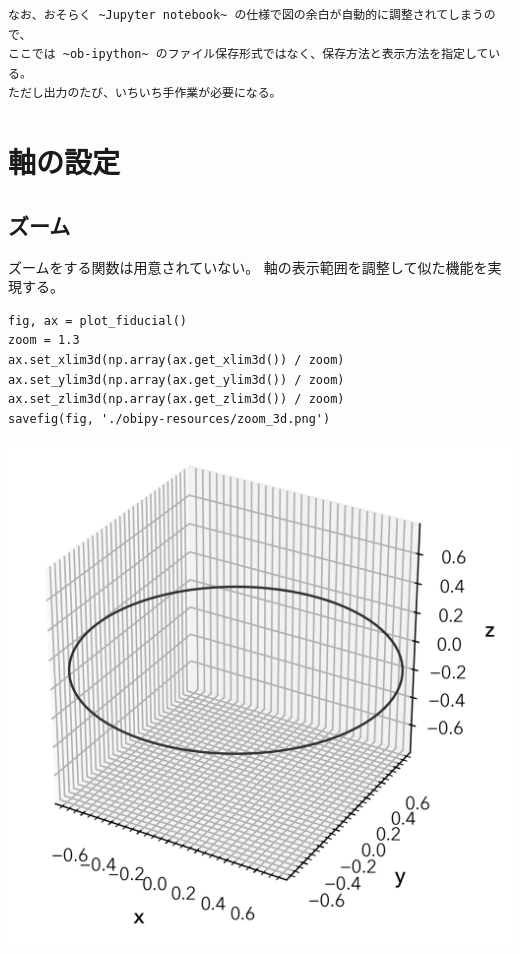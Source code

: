 \documentclass[a4paper, 10pt, notitlepage, twocolumn, uplatex, oneside, dvipdfmx]{jsarticle}
\begin{document}
\begin{verbatim}
なお、おそらく ~Jupyter notebook~ の仕様で図の余白が自動的に調整されてしまうので、
ここでは ~ob-ipython~ のファイル保存形式ではなく、保存方法と表示方法を指定している。
ただし出力のたび、いちいち手作業が必要になる。
\end{verbatim}
\section{軸の設定}
\label{sec:orga4fb952}
\subsection{ズーム}
\label{sec:org53ecb87}
ズームをする関数は用意されていない。
軸の表示範囲を調整して似た機能を実現する。
\begin{verbatim}
fig, ax = plot_fiducial()
zoom = 1.3
ax.set_xlim3d(np.array(ax.get_xlim3d()) / zoom)
ax.set_ylim3d(np.array(ax.get_ylim3d()) / zoom)
ax.set_zlim3d(np.array(ax.get_zlim3d()) / zoom)
savefig(fig, './obipy-resources/zoom_3d.png')
\end{verbatim}

\label{}
\begin{center}
\includegraphics[width=1.0\linewidth]{./obipy-resources/zoom_3d.png}
\end{center}
\end{document}
